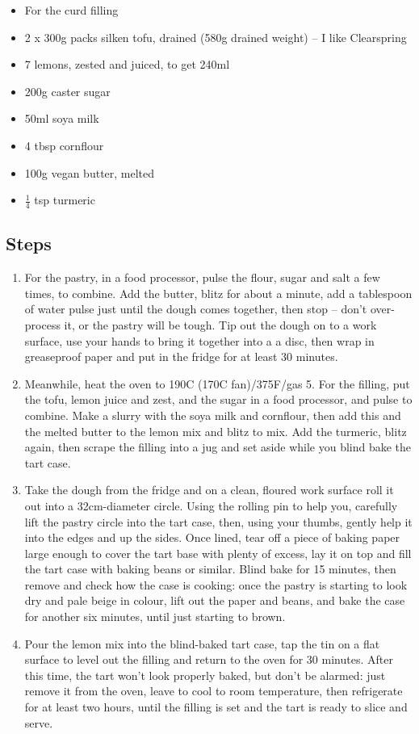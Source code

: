 \documentclass{book}
\begin{document}
\begin{itemize}
\item For the curd filling
\item 2 x 300g packs silken tofu, drained (580g drained weight) – I like Clearspring
\item 7 lemons, zested and juiced, to get 240ml 
\item 200g caster sugar
\item 50ml soya milk
\item 4 tbsp cornflour
\item 100g vegan butter, melted
\item $\frac{1}{4}$ tsp turmeric
\end{itemize}

\subsection*{Steps}
\begin{enumerate}
\item For the pastry, in a food processor, pulse the flour, sugar and salt a few times, to combine. Add the butter, blitz for about a minute, add a tablespoon of water pulse just until the dough comes together, then stop – don’t over-process it, or the pastry will be tough. Tip out the dough on to a work surface, use your hands to bring it together into a a disc, then wrap in greaseproof paper and put in the fridge for at least 30 minutes.
\item Meanwhile, heat the oven to 190C (170C fan)/375F/gas 5. For the filling, put the tofu, lemon juice and zest, and the sugar in a food processor, and pulse to combine. Make a slurry with the soya milk and cornflour, then add this and the melted butter to the lemon mix and blitz to mix. Add the turmeric, blitz again, then scrape the filling into a jug and set aside while you blind bake the tart case.
\item Take the dough from the fridge and on a clean, floured work surface roll it out into a 32cm-diameter circle. Using the rolling pin to help you, carefully lift the pastry circle into the tart case, then, using your thumbs, gently help it into the edges and up the sides. Once lined, tear off a piece of baking paper large enough to cover the tart base with plenty of excess, lay it on top and fill the tart case with baking beans or similar. Blind bake for 15 minutes, then remove and check how the case is cooking: once the pastry is starting to look dry and pale beige in colour, lift out the paper and beans, and bake the case for another six minutes, until just starting to brown.
\item Pour the lemon mix into the blind-baked tart case, tap the tin on a flat surface to level out the filling and return to the oven for 30 minutes. After this time, the tart won’t look properly baked, but don’t be alarmed: just remove it from the oven, leave to cool to room temperature, then refrigerate for at least two hours, until the filling is set and the tart is ready to slice and serve.
\end{enumerate}
\newpage
\end{document}
